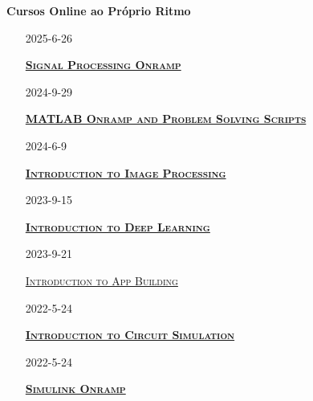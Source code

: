 \documentclass[10pt,a4paper,oneside]{article}
\newlength{\datewidth}
\newlength{\textindent}
\begin{document}
	\vspace{5mm}
	\textbf{\hspace{\textindent}Cursos Online ao Próprio Ritmo}
	\begin{itemize}
		\item[\hspace{\datewidth}\scriptsize 2025-6-26] \parbox[t]{\dimexpr\linewidth-\datewidth-\textindent}{\href{https://matlabacademy.mathworks.com/progress/share/certificate.html?id=8d446314-2eac-4c3c-9809-fff2192233a2&}{\textsc{\textbf{Signal Processing Onramp}}}}
		
		\item[\hspace{\datewidth}\scriptsize 2024-9-29] \parbox[t]{\dimexpr\linewidth-\datewidth-\textindent}{\href{https://matlabacademy.mathworks.com/progress/share/certificate.html?id=ae2e7096-91ff-4827-8c07-6885827ff584&}{\textsc{\textbf{MATLAB Onramp and Problem Solving Scripts}}}}
		
		\item[\hspace{\datewidth}\scriptsize 2024-6-9] \parbox[t]{\dimexpr\linewidth-\datewidth-\textindent}{\href{https://matlabacademy.mathworks.com/progress/share/report.html?id=c9b24992-b614-48d2-a06f-0546c9d9d412&}{\textsc{\textbf{Introduction to Image Processing}}}}
		
		\item[\hspace{\datewidth}\scriptsize 2023-9-15] \parbox[t]{\dimexpr\linewidth-\datewidth-\textindent}{\href{https://matlabacademy.mathworks.com/progress/share/report.html?id=a773357e-1315-4d27-8bdc-ff2af04983a1&}{\textsc{\textbf{Introduction to Deep Learning}}}}
		
		\item[\hspace{\datewidth}\scriptsize 2023-9-21] \parbox[t]{\dimexpr\linewidth-\datewidth-\textindent}{\href{https://matlabacademy.mathworks.com/progress/share/report.html?id=8db10b82-5beb-4543-87c7-c8e13c5f7ccf&}{\textsc{Introduction to App Building}}}
		
		\item[\hspace{\datewidth}\scriptsize 2022-5-24] \parbox[t]{\dimexpr\linewidth-\datewidth-\textindent}{\href{https://matlabacademy.mathworks.com/progress/share/report.html?id=8e8b78c7-bd81-496c-b869-37bb71db1a39&}{\textsc{\textbf{Introduction to Circuit Simulation}}}}
		
		\item[\hspace{\datewidth}\scriptsize 2022-5-24] \parbox[t]{\dimexpr\linewidth-\datewidth-\textindent}{\href{https://matlabacademy.mathworks.com/progress/share/report.html?id=9a64293c-a2bd-48b0-b613-dc2d2b0ed99d&}{\textsc{\textbf{Simulink Onramp}}}}
	\end{itemize}
	
\end{document}
